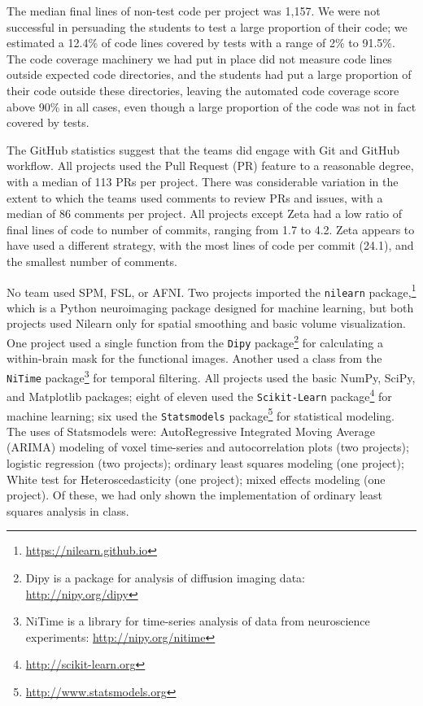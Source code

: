 The median final lines of non-test code per project was 1,157.  We were not
successful in persuading the students to test a large proportion of their
code; we estimated a 12.4\% of code lines covered by tests with a range of 2\%
to 91.5\%.  The code coverage machinery we had put in place did not measure
code lines outside expected code directories, and the students had put a
large proportion of their code outside these directories, leaving the
automated code coverage score above 90\% in all cases, even though a large
proportion of the code was not in fact covered by tests.

The GitHub statistics suggest that the teams did engage with Git and GitHub
workflow.  All projects used the Pull Request (PR) feature to a reasonable
degree, with a median of 113 PRs per project.  There was considerable
variation in the extent to which the teams used comments to review PRs and
issues, with a median of 86 comments per project. All projects except Zeta had
a low ratio of final lines of code to number of commits, ranging from 1.7 to
4.2.  Zeta appears to have used a different strategy, with the most lines of
code per commit (24.1), and the smallest number of comments.

No team used SPM, FSL, or AFNI.  Two projects imported the
\texttt{nilearn} package,\footnote{\url{https://nilearn.github.io}} which is a
Python neuroimaging package designed for machine learning, but both projects
used Nilearn only for spatial smoothing and basic volume visualization.  One
project used a single function from the
\texttt{Dipy} package\footnote{Dipy is a package for analysis of diffusion
imaging data: \url{http://nipy.org/dipy}} for calculating a
within-brain mask for the functional images.  Another used a class from the
\texttt{NiTime} package\footnote{NiTime is a library for time-series analysis
of data from neuroscience experiments: \url{http://nipy.org/nitime}} for
temporal filtering.  All projects used the basic NumPy, SciPy, and Matplotlib
packages; eight of eleven used the \texttt{Scikit-Learn}
package\footnote{\url{http://scikit-learn.org}} for machine learning; six used
the \texttt{Statsmodels} package\footnote{\url{http://www.statsmodels.org}}
for statistical modeling.  The uses of Statsmodels were: AutoRegressive
Integrated Moving Average (ARIMA) modeling of voxel time-series and
autocorrelation plots (two projects); logistic regression (two projects);
ordinary least squares modeling (one project); White test for
Heteroscedasticity (one project); mixed effects modeling (one project).  Of
these, we had only shown the implementation of ordinary least squares analysis
in class.

